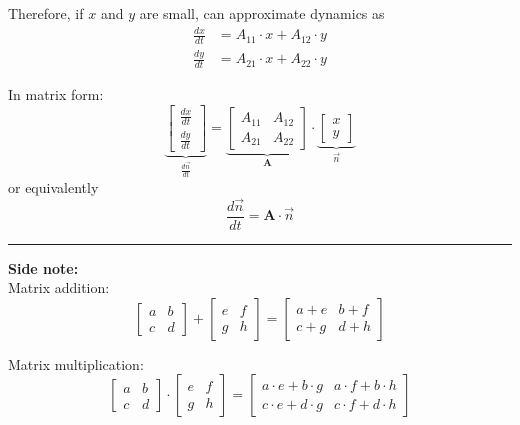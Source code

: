 \documentclass{article}
\begin{document}
Therefore, if $x$ and $y$ are small, can approximate dynamics as
\begin{align*}
	\frac{dx}{dt}&=A_{11} \cdot x + A_{12} \cdot y\\	
	\frac{dy}{dt}&=A_{21} \cdot x + A_{22} \cdot y
\end{align*}

In matrix form:
\begin{equation*}
	\underbrace{\begin{bmatrix}\frac{dx}{dt} \\ \frac{dy}{dt}\end{bmatrix}}_{\frac{d \vec{n}}{dt}} = \underbrace{ \begin{bmatrix}A_{11} & A_{12}\\ A_{21} & A_{22}\end{bmatrix}}_{\mathbf{A}} \cdot \underbrace{\begin{bmatrix}x \\ y\end{bmatrix}}_{\vec{n}}
\end{equation*}
or equivalently
\begin{equation*}
	\frac{d \vec{n}}{dt}= \mathbf{A} \cdot \vec{n}
\end{equation*}

\rule[0.5ex]{\linewidth}{1pt}
\textbf{Side note:}\\
Matrix addition:
\begin{equation*}
 \begin{bmatrix} a & b \\ c & d \end{bmatrix} + \begin{bmatrix} e & f \\ g & h \end{bmatrix} = \begin{bmatrix} a+e & b+f \\ c+g & d+h \end{bmatrix}
\end{equation*}

Matrix multiplication:
\begin{equation*}
 \begin{bmatrix} a & b \\ c & d \end{bmatrix} \cdot \begin{bmatrix} e & f \\ g & h \end{bmatrix} = \begin{bmatrix} a \cdot e + b \cdot g & a \cdot f + b \cdot h \\ c \cdot e + d \cdot g & c \cdot f + d \cdot h \end{bmatrix}
\end{equation*}
\end{document}
